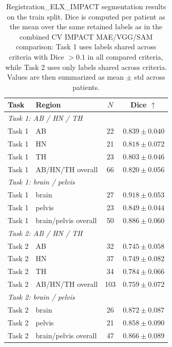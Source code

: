 \begin{table}[t]
\centering
\caption{Registration\_ELX\_IMPACT segmentation results on the train split. Dice is computed per patient as the mean over the same retained labels as in the combined CV IMPACT MAE/VGG/SAM comparison: Task 1 uses labels shared across criteria with Dice $> 0.1$ in all compared criteria, while Task 2 uses only labels shared across criteria. Values are then summarized as mean $\pm$ std across patients.}
\label{tab:registration-elx-impact-seg}
\begin{tabular}{llcc}
\toprule
Task & Region & $N$ & Dice $\uparrow$ \\
\midrule
\multicolumn{4}{l}{\textit{Task 1: AB / HN / TH}} \\
Task 1 & AB & 22 & $0.839 \pm 0.040$ \\
Task 1 & HN & 21 & $0.818 \pm 0.072$ \\
Task 1 & TH & 23 & $0.803 \pm 0.046$ \\
Task 1 & AB/HN/TH overall & 66 & $0.820 \pm 0.056$ \\
\midrule
\multicolumn{4}{l}{\textit{Task 1: brain / pelvis}} \\
Task 1 & brain & 27 & $0.918 \pm 0.053$ \\
Task 1 & pelvis & 23 & $0.849 \pm 0.044$ \\
Task 1 & brain/pelvis overall & 50 & $0.886 \pm 0.060$ \\
\midrule
\multicolumn{4}{l}{\textit{Task 2: AB / HN / TH}} \\
Task 2 & AB & 32 & $0.745 \pm 0.058$ \\
Task 2 & HN & 37 & $0.749 \pm 0.082$ \\
Task 2 & TH & 34 & $0.784 \pm 0.066$ \\
Task 2 & AB/HN/TH overall & 103 & $0.759 \pm 0.072$ \\
\midrule
\multicolumn{4}{l}{\textit{Task 2: brain / pelvis}} \\
Task 2 & brain & 26 & $0.872 \pm 0.087$ \\
Task 2 & pelvis & 21 & $0.858 \pm 0.090$ \\
Task 2 & brain/pelvis overall & 47 & $0.866 \pm 0.089$ \\
\bottomrule
\end{tabular}
\end{table}
